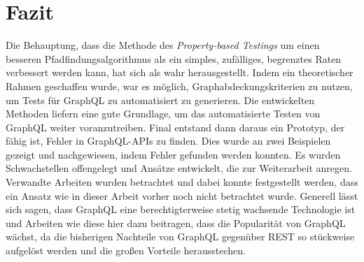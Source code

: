 \chapter{Fazit}
\label{fazit}

Die Behauptung, dass die Methode des \textit{Property-based Testings} um einen besseren Pfadfindungsalgorithmus als ein simples, zufälliges, begrenztes Raten verbessert werden kann, hat sich als wahr herausgestellt.
Indem ein theoretischer Rahmen geschaffen wurde, war es möglich, Graphabdeckungskriterien zu nutzen, um Tests für GraphQL zu automatisiert zu generieren.
Die entwickelten Methoden liefern eine gute Grundlage, um das automatisierte Testen von GraphQL weiter voranzutreiben.
Final entstand dann daraus ein Prototyp, der fähig ist, Fehler in GraphQL-APIs zu finden.
Dies wurde an zwei Beispielen gezeigt und nachgewiesen, indem Fehler gefunden werden konnten.
Es wurden Schwachstellen offengelegt und Ansätze entwickelt, die zur Weiterarbeit anregen.
Verwandte Arbeiten wurden betrachtet und dabei konnte festgestellt werden, dass ein Ansatz wie in dieser Arbeit vorher noch nicht betrachtet wurde.
Generell lässt sich sagen, dass GraphQL eine berechtigterweise stetig wachsende Technologie ist und Arbeiten wie diese hier
dazu beitragen, dass die Popularität von GraphQL wächst, da die bisherigen Nachteile von GraphQL gegenüber REST so stückweise aufgelöst werden
und die großen Vorteile herausstechen.

